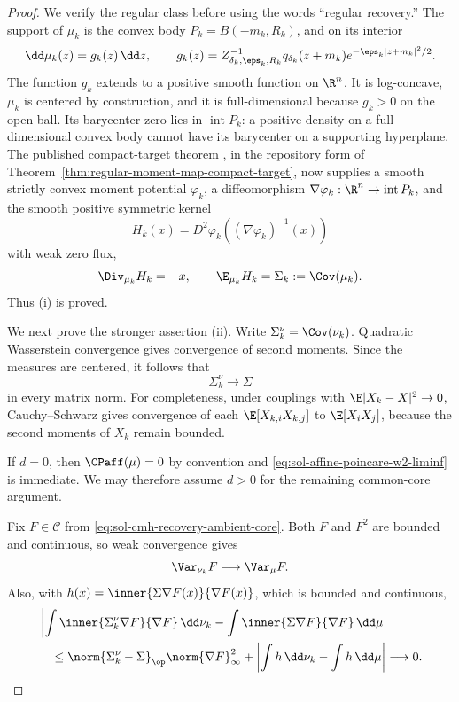 \documentclass[../main.tex]{subfiles}
\begin{document}
\begin{proof}
We verify the regular class before using the words ``regular recovery.''  The support of
$\mu_k$ is the convex body $P_k=B(-m_k,R_k)$, and on its interior
\[
  \dd\mu_k(z)=g_k(z)\,\dd z,
  \qquad
  g_k(z)=Z_{\delta_k,\eps_k,R_k}^{-1}
  q_{\delta_k}(z+m_k)e^{-\eps_k|z+m_k|^2/2}.
\]
The function $g_k$ extends to a positive smooth function on $\R^n$.  It is log-concave,
$\mu_k$ is centered by construction, and it is full-dimensional because $g_k>0$ on the open
ball.  Its barycenter zero lies in $\operatorname{int}P_k$: a positive density on a
full-dimensional convex body cannot have its barycenter on a supporting hyperplane.
The published compact-target theorem
\cite{BermanBerndtsson2013RealMA,Fathi2019SteinMomentMaps}, in the repository form of
Theorem~\ref{thm:regular-moment-map-compact-target}, now supplies a smooth strictly convex
moment potential $\varphi_k$, a diffeomorphism
$\nabla\varphi_k:\R^n\to\operatorname{int}P_k$, and the smooth positive symmetric kernel
\[
 H_k(x)=D^2\varphi_k((\nabla\varphi_k)^{-1}(x))
\]
with weak zero flux,
\begin{equation}
  \Div_{\mu_k}H_k=-x,
  \qquad \E_{\mu_k}H_k=\Sigma_k:=\Cov(\mu_k).
  \label{eq:sol-cmh-recovery-stein}
\end{equation}
Thus (i) is proved.

We next prove the stronger assertion (ii).  Write $\Sigma_k^\nu=\Cov(\nu_k)$.  Quadratic
Wasserstein convergence gives convergence of second moments.  Since the measures are centered,
it follows that
\begin{equation}
  \Sigma_k^\nu\longrightarrow\Sigma
  \label{eq:sol-cmh-recovery-covariance-convergence}
\end{equation}
in every matrix norm.  For completeness, under couplings with
$\E|X_k-X|^2\to0$, Cauchy--Schwarz gives convergence of each
$\E[X_{k,i}X_{k,j}]$ to $\E[X_iX_j]$, because the second moments of $X_k$ remain bounded.

If $d=0$, then $\CPaff(\mu)=0$ by convention and
\eqref{eq:sol-affine-poincare-w2-liminf} is immediate.  We may therefore assume $d>0$ for the
remaining common-core argument.

Fix $F\in\mathscr C$ from \eqref{eq:sol-cmh-recovery-ambient-core}.  Both $F$ and $F^2$ are
bounded and continuous, so weak convergence gives
\begin{equation}
  \Var_{\nu_k}F\longrightarrow\Var_\mu F.
  \label{eq:sol-cmh-recovery-variance-convergence}
\end{equation}
Also, with $h(x)=\inner{\Sigma\nabla F(x)}{\nabla F(x)}$, which is bounded and continuous,
\begin{align}
 &\left|\int\inner{\Sigma_k^\nu\nabla F}{\nabla F}\,\dd\nu_k
       -\int\inner{\Sigma\nabla F}{\nabla F}\,\dd\mu\right| \notag\\
 &\quad\le
 \norm{\Sigma_k^\nu-\Sigma}_\op\norm{\nabla F}_\infty^2
 +\left|\int h\,\dd\nu_k-\int h\,\dd\mu\right|
 \longrightarrow0.
 \label{eq:sol-cmh-recovery-energy-convergence}
\end{align}


\end{proof}
\end{document}
